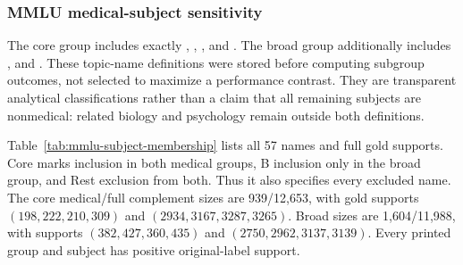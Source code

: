\subsubsection{MMLU medical-subject sensitivity}\label{app:robustness-mmlu}

The core group includes exactly , , ,  and . The broad group additionally includes ,  and . These topic-name definitions were stored before computing subgroup outcomes, not selected to maximize a performance contrast. They are transparent analytical classifications rather than a claim that all remaining subjects are nonmedical: related biology and psychology remain outside both definitions.

Table~\ref{tab:mmlu-subject-membership} lists all 57 names and full gold supports. Core marks inclusion in both medical groups, B inclusion only in the broad group, and Rest exclusion from both. Thus it also specifies every excluded name. The core medical/full complement sizes are 939/12,653, with gold supports $(198,222,210,309)$ and $(2934,3167,3287,3265)$. Broad sizes are 1,604/11,988, with supports $(382,427,360,435)$ and $(2750,2962,3137,3139)$. Every printed group and subject has positive original-label support.

